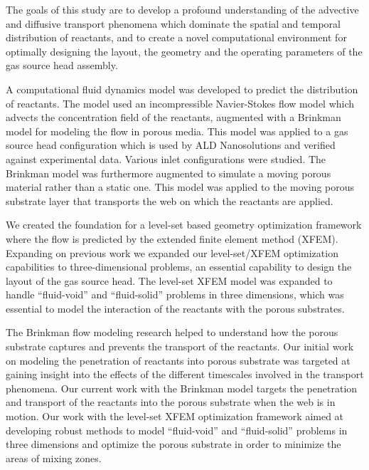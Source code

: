 The goals of this study are to develop a profound understanding of the advective and diffusive transport phenomena which dominate the spatial and temporal distribution of reactants, and to create a novel computational environment for optimally designing the layout, the geometry and the operating parameters of the gas source head assembly.


A computational fluid dynamics model was developed to predict the distribution of reactants. The model used an incompressible Navier-Stokes flow model which advects the concentration field of the reactants, augmented with a Brinkman model \citep{BP:03} for modeling the flow in porous media. This model was applied to a gas source head configuration which is used by ALD Nanosolutions and verified against experimental data. Various inlet configurations were studied. The Brinkman model was furthermore augmented to simulate a moving porous material rather than a static one. This model was applied to the moving porous substrate layer that transports the web on which the reactants are applied. 

We created the foundation for a level-set based geometry optimization framework where the flow is predicted by the extended finite element method (XFEM). Expanding on previous work we expanded our level-set/XFEM optimization capabilities to three-dimensional problems, an essential capability to design the layout of the gas source head. The level-set XFEM model was expanded to handle ``fluid-void'' and ``fluid-solid'' problems in three dimensions, which was essential to model the interaction of the reactants with the porous substrates.

The Brinkman flow modeling research helped to understand how the porous substrate captures and prevents the transport of the reactants. Our initial work on modeling the penetration of reactants into porous substrate was targeted at gaining insight into the effects of the different timescales involved in the transport phenomena. Our current work with the Brinkman model targets the penetration and transport of the reactants into the porous substrate when the web is in motion. Our work with the level-set XFEM optimization framework aimed at developing robust methods to model ``fluid-void'' and ``fluid-solid'' problems in three dimensions and optimize the porous substrate in order to minimize the areas of mixing zones.

